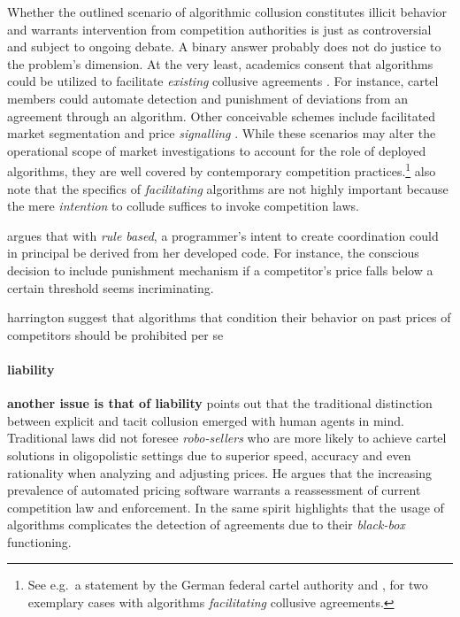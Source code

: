 Whether the outlined scenario of algorithmic collusion constitutes illicit behavior and warrants intervention from competition authorities is just as controversial and subject to ongoing debate. A binary answer probably does not do justice to the problem's dimension. At the very least, academics consent that algorithms could be utilized to facilitate \emph{existing} collusive agreements \parencite[p.219]{ezrachi_sustainable_2018}. For instance, cartel members could automate detection and punishment of deviations from an agreement through an algorithm. Other conceivable schemes include facilitated market segmentation and price \emph{signalling} \parencite[p.29]{oecd_price_2016}. While these scenarios may alter the operational scope of market investigations to account for the role of deployed algorithms, they are well covered by contemporary competition practices.\footnote{See e.g.\ a statement by the German federal cartel authority \parencite{bundeskartellamt_working_nodate} and \textcite{cma_case_2016}, \textcite{oefgen_decision_2019} for two exemplary cases with algorithms \emph{facilitating} collusive agreements.} \textcite{bundeskartellamt_working_nodate} also note that the specifics of \emph{facilitating} algorithms are not highly important because the mere \emph{intention} to collude suffices to invoke competition laws.

\textcite[pp.25-45]{gal_algorithms_2018} argues that with \emph{rule based}, a programmer's intent to create coordination could in principal be derived from her developed code. For instance, the conscious decision to include punishment mechanism if a competitor's price falls below a certain threshold seems incriminating.

harrington suggest that algorithms that condition their behavior on past prices of competitors should be prohibited per se

\paragraph{liability}

   




\textbf{another issue is that of liability}
\textcite{mehra_antitrust_2015} points out that the traditional distinction between explicit and tacit collusion emerged with human agents in mind. Traditional laws did not foresee \emph{robo-sellers} who are more likely to achieve cartel solutions in oligopolistic settings due to superior speed, accuracy and even rationality when analyzing and adjusting prices. He argues that the increasing prevalence of automated pricing software warrants a reassessment of current competition law and enforcement. In the same spirit \textcite[p.29]{gal_algorithms_2018} highlights that the usage of algorithms complicates the detection of agreements due to their \emph{black-box} functioning.

